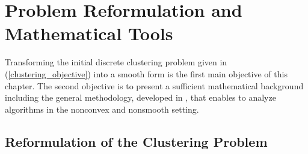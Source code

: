  \chapter{Problem Reformulation and Mathematical Tools} \label{Chptr2}

\noindent \noindent \hrulefill

Transforming the initial discrete clustering problem given in (\ref{clustering_objective}) into a smooth form is the first main objective of this chapter. The second objective is to present a sufficient mathematical background including the general methodology, developed in \cite{BST2014}, that enables to analyze algorithms in the nonconvex and nonsmooth setting. 

\noindent \noindent \hrulefill

\section{Reformulation of the Clustering Problem} \label{State_Clustering_Reformulation}

